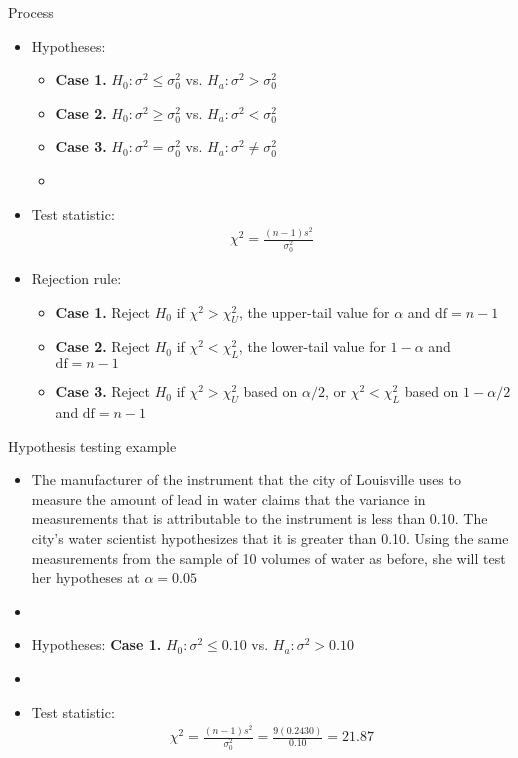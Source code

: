 \documentclass[xcolor=dvipsnames]{beamer}
\begin{document}
\begin{frame}{Process}
	\begin{itemize}
		\item Hypotheses: \pause
		\begin{itemize}
			\item \textbf{Case 1.} $H_0: \sigma^2 \leq \sigma_0^2$ vs. $H_a: \sigma^2 > \sigma_0^2$ \pause
			\item \textbf{Case 2.} $H_0: \sigma^2 \geq \sigma_0^2$ vs. $H_a: \sigma^2 < \sigma_0^2$ \pause
			\item \textbf{Case 3.} $H_0: \sigma^2 = \sigma_0^2$ vs. $H_a: \sigma^2 \neq \sigma_0^2$ \pause
			\item[]
		\end{itemize}
		
		\item Test statistic: \pause
		\begin{gather*}
		\chi^2 = \frac{(n-1)s^2}{\sigma_0^2}
		\end{gather*} \pause
		
		\item Rejection rule: \pause
		\begin{itemize}
			\item \textbf{Case 1.} Reject $H_0$ if $\chi^2 > \chi_U^2$, the upper-tail value for $\alpha$ and $\text{df} = n-1$ \pause
			\item \textbf{Case 2.} Reject $H_0$ if $\chi^2 < \chi_L^2$, the lower-tail value for $1-\alpha$ and $\text{df} = n-1$ \pause
			\item \textbf{Case 3.} Reject $H_0$ if $\chi^2 > \chi_U^2$ based on $\alpha/2$, or $\chi^2 < \chi_L^2$ based on $1-\alpha/2$ and $\text{df}=n-1$
		\end{itemize}
	\end{itemize}
\end{frame}

\begin{frame}{Hypothesis testing example}
	\begin{itemize}
		\item The manufacturer of the instrument that the city of Louisville uses to measure the amount of lead in water claims that the variance in measurements that is attributable to the instrument is less than 0.10. The city's water scientist hypothesizes that it is greater than 0.10. Using the same measurements from the sample of 10 volumes of water as before, she will test her hypotheses at $\alpha = 0.05$ \pause
		\item[]
		\item Hypotheses: \textbf{Case 1.} $H_0: \sigma^2 \leq 0.10$ vs. $H_a: \sigma^2 > 0.10$ \pause
		\item[]
		\item Test statistic:
		\begin{gather*}
		\chi^2 = \frac{(n-1)s^2}{\sigma_0^2} = \frac{9 (0.2430)}{0.10} =  21.87
		\end{gather*}
	\end{itemize}
\end{frame}
\end{document}
